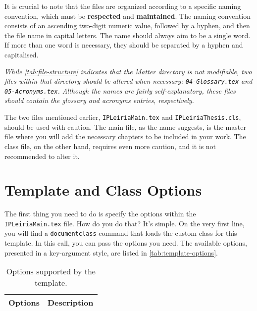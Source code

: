 {It is crucial to note that the files are organized according to a specific naming convention, which must be \textbf{respected} and \textbf{maintained}. The naming convention consists of an ascending two-digit numeric value, followed by a hyphen, and then the file name in capital letters. The name should always aim to be a single word. If more than one word is necessary, they should be separated by a hyphen and capitalised.


\begin{block}[note]
\textit{While \autoref{tab:file-structure} indicates that the \textit{Matter} directory is not modifiable, two files within that directory should be altered when necessary: \texttt{04-Glossary.tex} and \texttt{05-Acronyms.tex}. Although the names are fairly self-explanatory, these files should contain the glossary and acronyms entries, respectively.}
\end{block}

The two files mentioned earlier, \texttt{IPLeiriaMain.tex} and \texttt{IPLeiriaThesis.cls}, should be used with caution. The main file, as the name suggests, is the master file where you will add the necessary chapters to be included in your work. The class file, on the other hand, requires even more caution, and it is not recommended to alter it.

\section{Template and Class Options}
\label{sec:class-options}
The first thing you need to do is specify the options within the \texttt{IPLeiriaMain.tex} file. How do you do that? It's simple. On the very first line, you will find a \texttt{documentclass} command that loads the custom class for this template. In this call, you can pass the options you need. The available options, presented in a key-argument style, are listed in \autoref{tab:template-options}.

\begin{table}[!htpb]
    \centering
    \setlength{\extrarowheight}{0pt}
    \caption{Options supported by the template.}
    \label{tab:template-options}
    \begin{tabularx}{\textwidth}{lX}
        \toprule
        \textbf{Options} & \textbf{Description} \\
        \midrule
        

\end{tabularx}
\end{table}}
